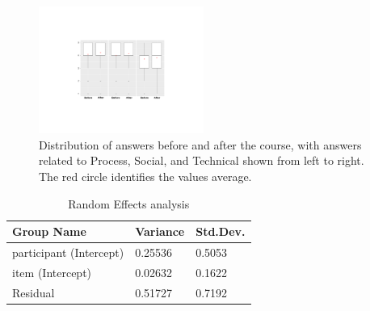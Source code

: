\documentclass[sigconf]{acmart}
\begin{document}
\begin{sloppy}
\begin{figure}
    \centering
    \includegraphics[width=0.48\textwidth, trim={6cm 5.5cm 6cm 5.5cm},clip]{BoxPlot3_new_1.pdf}
    \caption{Distribution of answers before and after the course, with answers related to Process, Social, and Technical shown from left to right. The red circle identifies the values average.}
    \label{fig:boxplot}
    \vspace{-5mm}
\end{figure}



\begin{table}[!ht]
    \caption{Random Effects analysis}
    \label{tab:randomEffs}
    \centering
    \footnotesize
    \begin{tabular}{lll}
    \toprule
        Group Name & Variance & Std.Dev. \\ \midrule
        participant (Intercept) & 0.25536 & 0.5053 \\
        item (Intercept) & 0.02632 & 0.1622 \\ 
        Residual & 0.51727 & 0.7192 \\ \bottomrule
    \end{tabular}
\vspace{-1mm}
\end{table}





\end{sloppy}
\end{document}
